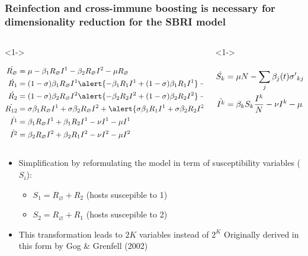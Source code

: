 \documentclass{beamer}
\begin{document}
\begin{frame}
  \frametitle{Reinfection and cross-immune boosting is necessary for
    dimensionality reduction for the SBRI model}

  \begin{columns}
    \begin{column}{0.7 \linewidth}<1->
      \begin{tiny}
        \begin{align}
          \dot{R_\varnothing} & = \mu -\beta_1 R_\varnothing I^1 -\beta_2 R_\varnothing I^2 -\mu R_\varnothing \notag \\
          \dot{R_1} & = (1-\sigma) \beta_1 R_\varnothing I^1 \alert{- \beta_1 R_1 I^1  + (1- \sigma) \beta_1 R_1 I^1} - \beta_2 R_1 I^2  -\mu R_1 \notag \\
          \dot{R_2} & = (1-\sigma) \beta_2 R_\varnothing I^2 \alert{- \beta_2 R_2 I^2 + (1 -\sigma) \beta_2 R_2 I^2} - \beta_1 R_2 I^1  -\mu R_2 \notag \\
          \dot{R_{12}} & = \sigma \beta_1 R_\varnothing I^1 + \sigma \beta_2 R_\varnothing I^2 + \alert{\sigma \beta_1 R_1 I^1 + \sigma \beta_2 R_2 I^2} + \beta_2 R_1 I^2  + \beta_1 R_2 I^1 -\mu R_{12} \notag \\
          \dot{I^1} & = \beta_1 R_\varnothing I^1 + \beta_1 R_2 I^1 -\nu I^1  -\mu I^1 \notag \\
          \dot{I^2} & = \beta_2 R_\varnothing I^2 + \beta_2 R_1 I^2 -\nu
          I^2 -\mu I^2 \notag
        \end{align}
      \end{tiny} 
    \end{column}
    \begin{column}{0.3 \linewidth}<1->
      \begin{tiny}
        \begin{align}
          \dot{S_k} &= \mu N -\sum_j \beta_j(t) {\sigma'}_{kj} S_k
          \frac{I^j}{N}
          - \mu S_k \notag\\
          \dot{I^k} &= \beta_k S_k \frac{I^k}{N} -\nu I^k -\mu I^k
          \notag
        \end{align}
      \end{tiny}

    \end{column}
  \end{columns}

  \begin{itemize}
  \item<1-> Simplification by reformulating the model in term of susceptibility
    variables ($S_i$):
    \begin{itemize}
    \item $S_1 = R_\varnothing + R_2$ (hosts suscepible to 1)
    \item $S_2= R_\varnothing + R_1$ (hosts suscepible to 2)
    \end{itemize}
  \item<1-> This transformation leads to $2K$ variables instead of $2^K$
    Originally derived in this form by Gog \& Grenfell (2002)


\end{itemize}
\end{frame}
\end{document}
